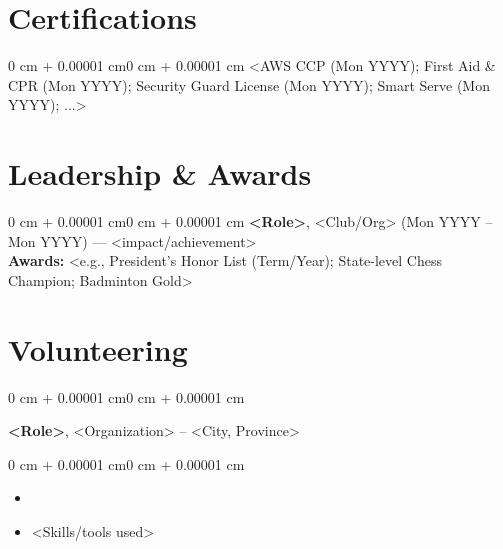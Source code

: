 \documentclass[10pt, letterpaper]{article}
\newenvironment{highlights}{\begin{itemize}[topsep=0.10 cm,parsep=0.10 cm,partopsep=0pt,itemsep=0pt,leftmargin=0 cm + 10pt]}{\end{itemize}}
\newenvironment{onecolentry}{\begin{adjustwidth}{0 cm + 0.00001 cm}{0 cm + 0.00001 cm}}{\end{adjustwidth}}
\newenvironment{twocolentry}[2][]{\onecolentry\def\secondColumn{#2}\setcolumnwidth{\fill, 4.5 cm}\begin{paracol}{2}}{\switchcolumn \raggedleft \secondColumn\end{paracol}\endonecolentry}
\begin{document}

\section{Certifications}
\begin{onecolentry}
    <AWS CCP (Mon YYYY); First Aid & CPR (Mon YYYY); Security Guard License (Mon YYYY); Smart Serve (Mon YYYY); ...>
\end{onecolentry}

\section{Leadership & Awards}
\begin{onecolentry}
    \textbf{<Role>}, <Club/Org> (Mon YYYY -- Mon YYYY) — <impact/achievement>\\
    \textbf{Awards:} <e.g., President's Honor List (Term/Year); State-level Chess Champion; Badminton Gold>
\end{onecolentry}

\section{Volunteering}
\begin{twocolentry}{<Mon YYYY -- Mon YYYY>}
    \textbf{<Role>}, <Organization> -- <City, Province>
\end{twocolentry}
\vspace{0.10 cm}
\begin{onecolentry}
    \begin{highlights}
        \item <Impact bullet>
        \item <Skills/tools used>
    \end{highlights}
\end{onecolentry}
\end{document}
